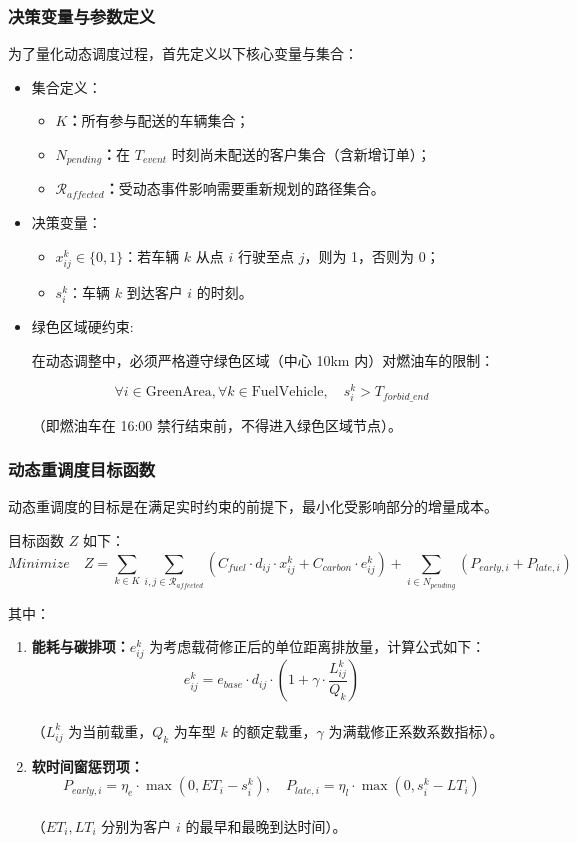 \documentclass[12pt,a4paper]{article}
\begin{document}
\subsubsection{决策变量与参数定义}
为了量化动态调度过程，首先定义以下核心变量与集合：
\begin{itemize}
    \item 集合定义：
        \begin{itemize}
            \item \textbf{$K$：}所有参与配送的车辆集合；
            \item \textbf{$N_{pending}$：}在 $T_{event}$ 时刻尚未配送的客户集合（含新增订单）；
            \item \textbf{$\mathcal{R}_{affected}$：}受动态事件影响需要重新规划的路径集合。
        \end{itemize}
    \item 决策变量：
        \begin{itemize}
            \item $x_{ij}^k \in \{0, 1\}$：若车辆 $k$ 从点 $i$ 行驶至点 $j$，则为 1，否则为 0；
            \item $s_{i}^k$：车辆 $k$ 到达客户 $i$ 的时刻。
        \end{itemize}
    \item 绿色区域硬约束:
    
    在动态调整中，必须严格遵守绿色区域（中心 10km 内）对燃油车的限制：
    
$$\forall i \in \text{GreenArea}, \forall k \in \text{FuelVehicle}, \quad s_i^k > T_{forbid\_end}$$

（即燃油车在 16:00 禁行结束前，不得进入绿色区域节点）。
\end{itemize}

\subsubsection{动态重调度目标函数}

动态重调度的目标是在满足实时约束的前提下，最小化受影响部分的增量成本。

目标函数 $Z$ 如下：\\
$$Minimize \quad Z = \sum_{k \in K} \sum_{i,j \in \mathcal{R}_{affected}} (C_{fuel} \cdot d_{ij} \cdot x_{ij}^k + C_{carbon} \cdot e_{ij}^k) + \sum_{i \in N_{pending}} (P_{early,i} + P_{late,i})$$

其中：
\begin{enumerate}
    \item \textbf{能耗与碳排项：}$e_{ij}^k$ 为考虑载荷修正后的单位距离排放量，计算公式如下：\\
    $$e_{ij}^k = e_{base} \cdot d_{ij} \cdot (1 + \gamma \cdot \frac{L_{ij}^k}{Q_k})$$\\
    （$L_{ij}^k$ 为当前载重，$Q_k$ 为车型 $k$ 的额定载重，$\gamma$ 为满载修正系数系数指标）。
    \item \textbf{软时间窗惩罚项：}$$P_{early,i} = \eta_e \cdot \max(0, ET_i - s_i^k), \quad P_{late,i} = \eta_l \cdot \max(0, s_i^k - LT_i)$$\\
    （$ET_i, LT_i$ 分别为客户 $i$ 的最早和最晚到达时间）。
\end{enumerate}
\end{document}
